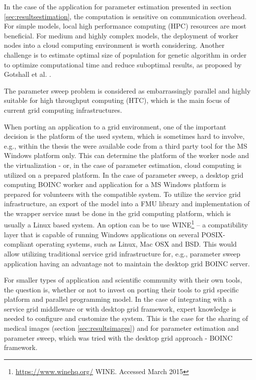 In the case of the application for parameter estimation presented in section \ref{sec:resultsestimation}, the computation is sensitive on communication overhead. For simple models, local high performance computing (HPC) resources are most beneficial. For medium and highly complex models, the deployment of worker nodes into a cloud computing environment is worth considering. Another challenge is to estimate optimal size of population for genetic algorithm in order to optimize computational time and reduce suboptimal results, as proposed by Gotshall et al.  \cite{Gotshall2000}.

The parameter sweep problem is considered as embarrassingly parallel and highly suitable for high throughput computing (HTC), which is the main focus of current grid computing infrastructures. 

When porting an application to a grid environment, one of the important decision is the platform of the used system, which is sometimes hard to involve, e.g., within the thesis the were available code from a third party tool for the MS Windows platform only. This can determine the platform of the worker node and the virtualization - or, in the case of parameter estimation, cloud computing is utilized on a prepared platform. In the case of parameter sweep, a desktop grid computing BOINC worker and application for a MS Windows platform is prepared for volunteers with the compatible system. To utilize the service grid infrastructure, an export of the model into a FMU library and implementation of the wrapper service must be done in the grid computing platform, which is usually a Linux based system. An option can be to use WINE\footnote{\url{https://www.winehq.org/} WINE. Accessed March 2015} -- a compatibility layer that is capable of running Windows applications on several POSIX-compliant operating systems, such as Linux, Mac OSX and BSD. This would allow utilizing traditional service grid infrastructure for, e.g., parameter sweep application having an advantage not to maintain the desktop grid BOINC server.

For smaller types of application and scientific community with their own tools, the question is, whether or not to invest on porting their tools to grid specific platform and parallel programming model. 
In the case of integrating with a service grid middleware or with desktop grid framework, expert knowledge is needed to configure and customize the system. This is the case for the sharing of medical images (section \ref{sec:resultsimages}) and for parameter estimation and parameter sweep, which was tried with the desktop grid approach - BOINC framework.%

